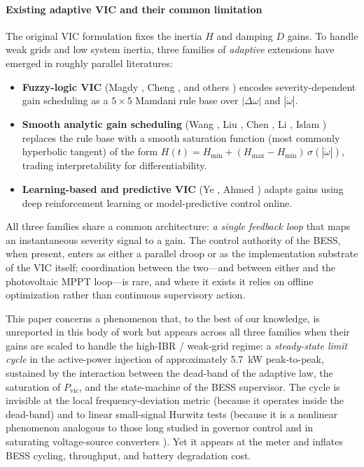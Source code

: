 \documentclass[journal]{IEEEtran}
\begin{document}
\paragraph*{Existing adaptive VIC and their common limitation}
The original VIC formulation \cite{bevrani2014virtual,liu2017comparison}
fixes the inertia $H$ and damping $D$ gains. To handle weak grids and
low system inertia, three families of \emph{adaptive} extensions have
emerged in roughly parallel literatures:
\begin{itemize}[leftmargin=*]
\item \textbf{Fuzzy-logic VIC} (Magdy \cite{magdy2018microgrid}, Cheng
\cite{cheng2024fuzzy}, and others \cite{ndirangu2026adaptive,islam2024novel})
encodes severity-dependent gain scheduling as a $5\times 5$ Mamdani rule
base over $|\Delta\omega|$ and $|\dot\omega|$.
\item \textbf{Smooth analytic gain scheduling} (Wang \cite{wang2024adaptive},
Liu \cite{liu2025cooperative}, Chen \cite{chen2024improved}, Li
\cite{li2024synergistic}, Islam \cite{islam2024novel}) replaces the
rule base with a smooth saturation function (most commonly hyperbolic
tangent) of the form
$H(t)=H_\mathrm{min}+(H_\mathrm{max}-H_\mathrm{min})\,\sigma(|\dot\omega|)$,
trading interpretability for differentiability.
\item \textbf{Learning-based and predictive VIC} (Ye \cite{ye2024drl},
Ahmed \cite{ahmed2024multiobjective}) adapts gains using deep
reinforcement learning or model-predictive control online.
\end{itemize}
All three families share a common architecture: \emph{a single feedback
loop} that maps an instantaneous severity signal to a gain. The
control authority of the BESS, when present, enters as either a
parallel droop \cite{jiang2020droop,wang2024hybrid} or as the
implementation substrate of the VIC itself; coordination between the
two---and between either and the photovoltaic MPPT loop---is rare,
and where it exists \cite{xu2020improved,zhang2025twolayer} it relies
on offline optimization rather than continuous supervisory action.

This paper concerns a phenomenon that, to the best of our knowledge,
is unreported in this body of work but appears across all three
families when their gains are scaled to handle the high-IBR /
weak-grid regime: a \emph{steady-state limit cycle} in the
active-power injection of approximately \SI{5.7}{\kW} peak-to-peak,
sustained by the interaction between the dead-band of
the adaptive law, the saturation of $P_\mathrm{vic}$, and the
state-machine of the BESS supervisor. The cycle is invisible at the
local frequency-deviation metric (because it operates inside the
dead-band) and to linear small-signal Hurwitz tests (because it is
a nonlinear phenomenon analogous to those long studied in governor
control \cite{atherton2019deadband} and in saturating voltage-source
converters \cite{wang2022describing,zou2021quantitative,kim2025selfexcited}).
Yet it appears at the meter and inflates BESS cycling, throughput, and
battery degradation cost.
\end{document}
